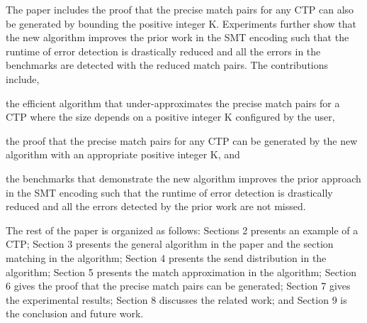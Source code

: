 The paper includes the proof that the precise match pairs for any CTP can also be generated by bounding the positive integer K. Experiments further show that the new algorithm improves the prior work in the SMT encoding such that the runtime of error detection is drastically reduced and all the errors in the benchmarks are detected with the reduced match pairs.
The contributions include,
\begin{compactitem}
\item the efficient algorithm that under-approximates the precise match pairs for a CTP where the size depends on a positive integer K configured by the user,
\item the proof that the precise match pairs for any CTP can be generated by the new algorithm with an appropriate positive integer K, and
\item the benchmarks that demonstrate the new algorithm improves the prior approach in the SMT encoding such that the runtime of error detection is drastically reduced and all the errors detected by the prior work are not missed. 
\end{compactitem}

The rest of the paper is organized as follows: 
Sections 2 presents an example of a CTP; Section 3 presents the general algorithm in the paper and the section matching in the algorithm; Section 4 presents the send distribution in the algorithm; Section 5 presents the match approximation in the algorithm; Section 6 gives the proof that the precise match pairs can be generated; Section 7 gives the experimental results; Section 8 discusses the related work; and Section 9 is the conclusion and future work.
